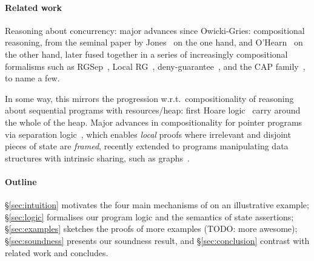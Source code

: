 \paragraph{Related work}
Reasoning about concurrency: major advances since Owicki-Gries:
compositional reasoning, from the seminal paper by Jones~\cite{rg} on
the one hand, and O'Hearn~\cite{csl-orig,csl-tcs} on the other hand,
later fused together in a series of increasingly compositional
formalisms such as RGSep~\cite{viktor-marriage}, Local RG~\cite{lrg},
deny-guarantee~\cite{dg}, and the CAP
family~\cite{cap-ecoop10,icap,tada}, to name a few.


In some way, this mirrors the progression w.r.t.\ compositionality of
reasoning about sequential programs with resources/heap: first Hoare
logic~\cite{hoarelogic} carry around the whole of the heap. Major
advances in compositionality for pointer programs via separation
logic~\cite{seplog}, which enables \emph{local} proofs where
irrelevant and disjoint pieces of state are \emph{framed}, recently
extended to programs manipulating data structures with intrinsic
sharing, such as graphs~\cite{ramification}.


\paragraph{Outline}
\S\ref{sec:intuition} motivates the four main mechanisms of \colosl on
an illustrative example; \S\ref{sec:logic} formalises our program
logic and the semantics of state assertions; \S\ref{sec:examples}
sketches the proofs of more examples (TODO: more awesome);
\S\ref{sec:soundness} presents our soundness result, and
\S\ref{sec:conclusion} contrast with related work and concludes.
